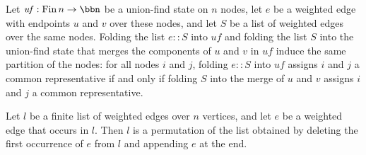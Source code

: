 \begin{lemma}
\label{Kruskal.mergeAll_cons_eq}
\leanok
{}
Let $\mathit{uf} : \mathrm{Fin}\,n \to \bbn$ be a union-find state on $n$ nodes, let $e$
be a weighted edge with endpoints $u$ and $v$ over these nodes, and let $S$ be a list of
weighted edges over the same nodes. Folding the list $e :: S$ into $\mathit{uf}$ and
folding the list $S$ into the union-find state that merges the components of $u$ and $v$
in $\mathit{uf}$ induce the same partition of the nodes: for all nodes $i$ and $j$,
folding $e :: S$ into $\mathit{uf}$ assigns $i$ and $j$ a common representative if and
only if folding $S$ into the merge of $u$ and $v$ assigns $i$ and $j$ a common
representative.
\end{lemma}

\begin{lemma}
\label{Kruskal.erase_append_perm}
\leanok
{}
Let $l$ be a finite list of weighted edges over $n$ vertices, and let $e$ be a weighted
edge that occurs in $l$. Then $l$ is a permutation of the list obtained by deleting the
first occurrence of $e$ from $l$ and appending $e$ at the end.
\end{lemma}
